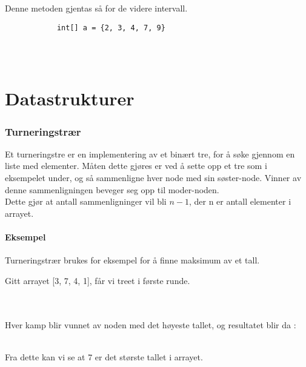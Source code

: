 \documentclass[11pt]{article}
\begin{document}
Denne metoden gjentas så for de videre intervall.

\begin{lstlisting}
			int[] a = {2, 3, 4, 7, 9}


		
		\end{lstlisting}

\newpage
\part{Datastrukturer}
\section{Turneringstrær}
Et turneringstre er en implementering av et binært tre, for å søke gjennom en liste med elementer.
Måten dette gjøres er ved å sette opp et tre som i eksempelet under, og så sammenligne hver node med sin søster-node.
Vinner av denne sammenligningen beveger seg opp til moder-noden. \\

Dette gjør at antall sammenligninger vil bli $n-1$, der n er antall elementer i arrayet.
\subsection{Eksempel}
Turneringstrær brukes for eksempel for å finne maksimum av et tall.\\
\begin{multicols}{2}
	Gitt arrayet [3, 7, 4, 1], får vi treet i første runde. \\\\\\

	\columnbreak

	Hver kamp blir vunnet av noden med det høyeste tallet, og resultatet blir da : \\\\

	Fra dette kan vi se at 7 er det største tallet i arrayet.
\end{multicols}
\end{document}
